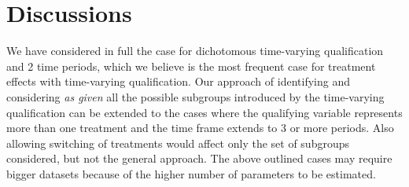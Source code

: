 \documentclass[12pt]{article}
\begin{document}
\section{Discussions}
We have considered in full the case for dichotomous time-varying qualification and 2 time periods, which we believe is the most frequent case for treatment effects with time-varying qualification. Our approach of identifying and considering \textit{as given} all the possible subgroups introduced by the time-varying qualification can be extended to the cases where the qualifying variable represents more than one treatment and the time frame extends to 3 or more periods. Also allowing switching of treatments would affect only the set of subgroups considered, but not the general approach. The above outlined cases may require bigger datasets because of the higher number of parameters to be estimated. 

\pagebreak



\appendix

\pagebreak
\end{document}
